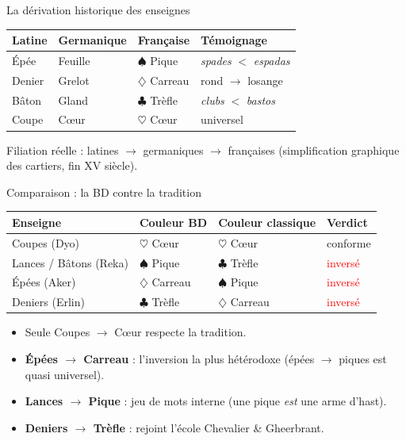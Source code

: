 \documentclass[11pt]{beamer}
\newcommand{\carreau}{\ensuremath{\diamondsuit}}
\newcommand{\coeur}{\ensuremath{\heartsuit}}
\newcommand{\pique}{\ensuremath{\spadesuit}}
\newcommand{\trefle}{\ensuremath{\clubsuit}}
\begin{document}
\begin{frame}{La dérivation historique des enseignes}
\begin{center}\small
\begin{tabular}{llll}
\toprule
\textbf{Latine} & \textbf{Germanique} & \textbf{Française} & \textbf{Témoignage} \\
\midrule
Épée & Feuille & \pique{} Pique & \emph{spades} $<$ \emph{espadas} \\
Denier & Grelot & \carreau{} Carreau & rond $\rightarrow$ losange \\
Bâton & Gland & \trefle{} Trèfle & \emph{clubs} $<$ \emph{bastos} \\
Coupe & Cœur & \coeur{} Cœur & universel \\
\bottomrule
\end{tabular}
\end{center}
\vspace{0.4em}
Filiation réelle : latines $\rightarrow$ germaniques $\rightarrow$ françaises
(simplification graphique des cartiers, fin XV\ieme{} siècle).
\end{frame}

\begin{frame}{Comparaison : la BD contre la tradition}
\begin{center}\small
\begin{tabular}{llll}
\toprule
\textbf{Enseigne} & \textbf{Couleur BD} & \textbf{Couleur classique} & \textbf{Verdict} \\
\midrule
Coupes (Dyo) & \coeur{} Cœur & \coeur{} Cœur & \textcolor{green!55!black}{conforme} \\
Lances / Bâtons (Reka) & \pique{} Pique & \trefle{} Trèfle & \textcolor{red}{inversé} \\
Épées (Aker) & \carreau{} Carreau & \pique{} Pique & \textcolor{red}{inversé} \\
Deniers (Erlin) & \trefle{} Trèfle & \carreau{} Carreau & \textcolor{red}{inversé} \\
\bottomrule
\end{tabular}
\end{center}
\vspace{0.4em}
\begin{itemize}\small
\item Seule Coupes $\rightarrow$ Cœur respecte la tradition.
\item \textbf{Épées $\rightarrow$ Carreau} : l'inversion la plus hétérodoxe
(épées $\rightarrow$ piques est quasi universel).
\item \textbf{Lances $\rightarrow$ Pique} : jeu de mots interne
(une pique \emph{est} une arme d'hast).
\item \textbf{Deniers $\rightarrow$ Trèfle} : rejoint l'école Chevalier \& Gheerbrant.
\end{itemize}
\end{frame}
\end{document}
